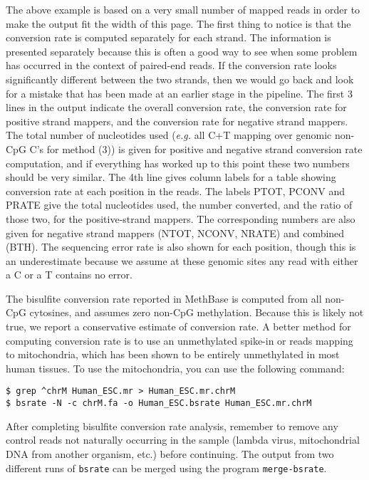 \documentclass[10pt]{article}
\newcommand{\prog}[1]{\texttt{#1}}
\begin{document}
\noindent
The above example is based on a very small number of mapped reads in
order to make the output fit the width of this page.  The first thing
to notice is that the conversion rate is computed separately for each
strand. The information is presented separately because this is often
a good way to see when some problem has occurred in the context of
paired-end reads. If the conversion rate looks significantly different
between the two strands, then we would go back and look for a mistake
that has been made at an earlier stage in the pipeline. The first 3
lines in the output indicate the overall conversion rate, the
conversion rate for positive strand mappers, and the conversion rate
for negative strand mappers. The total number of nucleotides used
({\em e.g.} all C+T mapping over genomic non-CpG C's for method (3)) is
given for positive and negative strand conversion rate computation,
and if everything has worked up to this point these two numbers should
be very similar. The 4th line gives column labels for a table showing
conversion rate at each position in the reads.  The labels PTOT, PCONV
and PRATE give the total nucleotides used, the number converted, and
the ratio of those two, for the positive-strand mappers. The
corresponding numbers are also given for negative strand mappers
(NTOT, NCONV, NRATE) and combined (BTH). The sequencing error rate is
also shown for each position, though this is an underestimate because
we assume at these genomic sites any read with either a C or a T
contains no error.

The bisulfite conversion rate reported in MethBase is computed from all
non-CpG cytosines, and assumes zero non-CpG methylation. Because this is
likely not true, we report a conservative estimate of conversion rate. A
better method for computing conversion rate is to use an unmethylated
spike-in or reads mapping to mitochondria, which has been shown to be
entirely unmethylated in most human tissues. To use the mitochondria,
you can use the following command:

\begin{verbatim}
$ grep ^chrM Human_ESC.mr > Human_ESC.mr.chrM
$ bsrate -N -c chrM.fa -o Human_ESC.bsrate Human_ESC.mr.chrM
\end{verbatim}

After completing bisulfite conversion rate analysis, remember to
remove any control reads not naturally occurring in the sample
(lambda virus, mitochondrial DNA from another organism, etc.)
before continuing. The output from two different runs of \prog{bsrate}
can be merged using the program \prog{merge-bsrate}.
\end{document}
